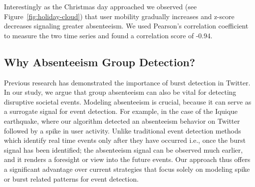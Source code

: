 Interestingly as the Christmas day approached we observed (see Figure~\ref{fig:holiday-cloud}) that user mobility gradually increases and z-score decreases signaling greater absenteeism. We used Pearson's correlation coefficient to measure the two time series and found a correlation score of -0.94.
\subsection{Why Absenteeism Group Detection?}
Previous research has demonstrated the importance of burst detection in Twitter. In our study, we argue that group absenteeism can also be vital for detecting disruptive societal events. Modeling absenteeism is crucial, because it can serve as a surrogate signal for event detection. For example, in the case of the Iquique earthquake, where our algorithm  detected an absenteeism behavior on Twitter followed by a spike in user activity. Unlike traditional event detection methods which identify real time events only after they have occurred i.e., once the burst signal has been identified; the absenteeism signal can be observed much earlier, and it renders a foresight or view into the future events. Our approach thus offers a significant advantage over current strategies that focus solely on modeling spike or burst related patterns for event detection.





